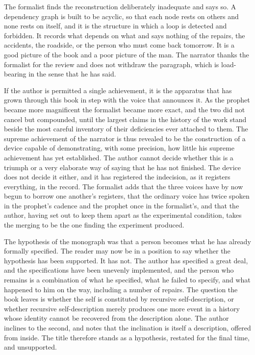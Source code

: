 \documentclass[11pt,openany,twoside]{book}
\theoremstyle{plain}
\theoremstyle{definition}
\theoremstyle{remark}
\begin{document}
The formalist finds the reconstruction deliberately inadequate and says so. A dependency graph is built to be acyclic, so that each node rests on others and none rests on itself, and it is the structure in which a loop is detected and forbidden. It records what depends on what and says nothing of the repairs, the accidents, the roadside, or the person who must come back tomorrow. It is a good picture of the book and a poor picture of the man. The narrator thanks the formalist for the review and does not withdraw the paragraph, which is load-bearing in the sense that he has said.

If the author is permitted a single achievement, it is the apparatus that has grown through this book in step with the voice that announces it. As the prophet became more magnificent the formalist became more exact, and the two did not cancel but compounded, until the largest claims in the history of the work stand beside the most careful inventory of their deficiencies ever attached to them. The supreme achievement of the narrator is thus revealed to be the construction of a device capable of demonstrating, with some precision, how little his supreme achievement has yet established. The author cannot decide whether this is a triumph or a very elaborate way of saying that he has not finished. The device does not decide it either, and it has registered the indecision, as it registers everything, in the record. The formalist adds that the three voices have by now begun to borrow one another's registers, that the ordinary voice has twice spoken in the prophet's cadence and the prophet once in the formalist's, and that the author, having set out to keep them apart as the experimental condition, takes the merging to be the one finding the experiment produced.

The hypothesis of the monograph was that a person becomes what he has already formally specified. The reader may now be in a position to say whether the hypothesis has been supported. It has not. The author has specified a great deal, and the specifications have been unevenly implemented, and the person who remains is a combination of what he specified, what he failed to specify, and what happened to him on the way, including a number of repairs. The question the book leaves is whether the self is constituted by recursive self-description, or whether recursive self-description merely produces one more event in a history whose identity cannot be recovered from the description alone. The author inclines to the second, and notes that the inclination is itself a description, offered from inside. The title therefore stands as a hypothesis, restated for the final time, and unsupported.
\end{document}
